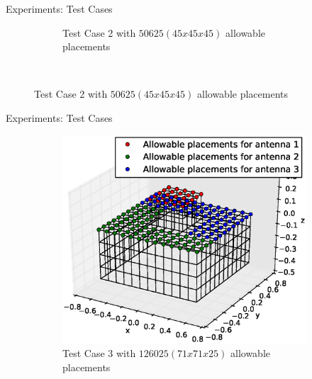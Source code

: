 \documentclass{beamer}
\begin{document}
\begin{frame}{Experiments: Test Cases}
\begin{figure}
\begin{subfigure}{.5\columnwidth}
                \caption{\tiny Test Case 2 with $50625 (45x45x45)$ allowable placements}%
                \label{fig:tc2_figure}%
            \end{subfigure}\hfill\\%
        \end{figure}
    \end{frame}

    \begin{frame}{Experiments: Test Cases}
        \begin{figure}
            \centering
            \begin{subfigure}{.5\columnwidth}
                \includegraphics[width=\columnwidth,height=\columnwidth]{../paper/FIG/tc_3_figure}%
                \caption{\tiny Test Case 3 with $126025 (71x71x25)$ allowable placements}%
                \label{fig:tc3_figure}%
            \end{subfigure}\hfill%
            \begin{subfigure}{.5\columnwidth}

\end{subfigure}
\end{figure}
\end{frame}
\end{document}
